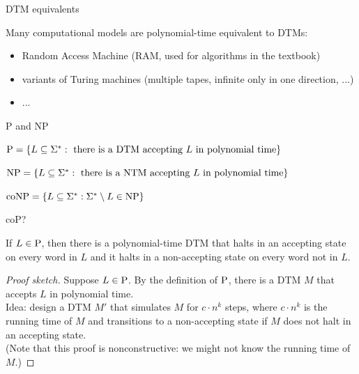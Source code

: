 \begin{frame}{DTM equivalents}

	Many computational models are polynomial-time equivalent to DTMs:
	\begin{itemize}
		\item Random Access Machine (RAM, used for algorithms in the textbook)
		\item variants of Turing machines (multiple tapes, infinite only in one direction, ...)
		\item ...
	\end{itemize}

\end{frame}


\begin{frame}{P and NP}

	\begin{definition}[P]
		$\P = \{L \subseteq \Sigma^* : \text{ there is a DTM accepting $L$ in polynomial time}\}$
	\end{definition}
	\begin{definition}[NP]
		$\NP = \{L \subseteq \Sigma^* : \text{ there is a NTM accepting $L$ in polynomial time}\}$
	\end{definition}
	\begin{definition}[coNP]
		$\coNP = \{L \subseteq \Sigma^* : \Sigma^*\setminus L \in \NP\}$
	\end{definition}

\end{frame}


\begin{frame}{coP?}

	\begin{theorem}
		If $L\in \P$, then there is a polynomial-time DTM that halts in an accepting state on every word in $L$ and it halts in a non-accepting state on every word not in $L$.
	\end{theorem}
	\pause
	\begin{proof}[Proof sketch]
		Suppose $L\in \P$. By the definition of $\P$, there is a DTM $M$ that accepts $L$ in polynomial time.\\
		Idea: design a DTM $M'$ that simulates $M$ for $c\cdot n^k$ steps, where $c\cdot n^k$ is the running time of $M$ and transitions to a non-accepting state if $M$ does not halt in an accepting state.\\
		(Note that this proof is nonconstructive: we might not know the running time of $M$.)
	\end{proof}

\end{frame}


